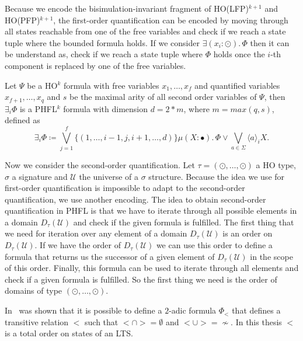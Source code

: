 Because we encode the bisimulation-invariant fragment of HO(LFP)$^{k + 1}$ and HO(PFP)$^{k+1}$, the first-order
quantification can be encoded by moving through all states reachable from one of the free variables and check if we
reach a state tuple where the bounded formula holds. If we consider $\exists (x_i \colon \odot).\,\Phi$ then it can be
understand as, check if we reach a state tuple where $\Phi$ holds once the $i$-th component is replaced by one of the
free variables.

\begin{definition}
    Let $\Psi$ be a HO$^k$ formula with free variables $x_1, \dots, x_f$ and quantified variables $x_{f+1}, \dots,
    x_q$ and $s$ be the maximal arity of all second order variables of $\Psi$, then $\exists_i \Phi$ is a PHFL$^k$
    formula with dimension $d = 2 * m$, where $m = max({q, s})$, defined as
    \[\exists_i \Phi \coloneqq \bigvee_{j=1}^f \{(1, \dots, i-1, j, i + 1, \dots, d)\} \mu (X
    \colon \bullet).\,\Phi \vee \bigvee_{a \in \Sigma} \langle a \rangle_i X.\]
\end{definition}

Now we consider the second-order quantification. Let $\tau = (\odot, \dots, \odot)$ a HO type, $\sigma$ a signature and
$\mathcal{U}$ the universe of a $\sigma$ structure. Because the idea we use for first-order quantification is
impossible to adapt to the second-order quantification, we use another encoding. The idea to obtain second-order
quantification in PHFL is that we have to iterate through all possible elements in a domain $D_\tau(\mathcal{U})$ and
check if the given formula is fulfilled. The first thing that we need for iteration over any element of a domain
$D_\tau(\mathcal{U})$ is an order on $D_\tau(\mathcal{U})$. If we have the order of $D_\tau(\mathcal{U})$ we can use
this order to define a formula that returns us the successor of a given element of $D_\tau(\mathcal{U})$ in the scope
of this order. Finally, this formula can be used to iterate through all elements and check if a given formula is
fulfilled.
So the first thing we need is the order of domains of type $(\odot, \dots, \odot)$.

\begin{remark}
    In~\cite{otto1999bisimulation} was shown that it is possible to define a $2$-adic formula $\Phi_<$ that defines a
    transitive relation $<$ such that $< \cap > = \emptyset$ and $< \cup > = \not\sim$. In this thesis $<$ is a total
    order on states of an LTS.
\end{remark}

